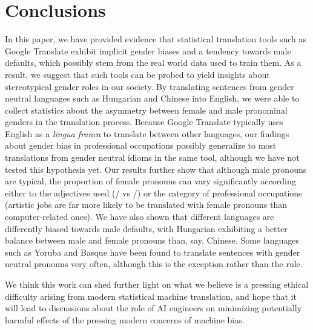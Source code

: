\documentclass[fleqn,10pt]{article}
\begin{document}
\section{Conclusions}
In this paper, we have provided evidence that statistical translation tools such as Google Translate exhibit implicit gender biases and a tendency towards male defaults, which possibly stem from the real world data used to train them. As a result, we suggest that such tools can be probed to yield insights about stereotypical gender roles in our society. By translating sentences from gender neutral languages such as Hungarian and Chinese into English, we were able to collect statistics about the asymmetry between female and male pronominal genders in the translation process. Because Google Translate typically uses English as a \emph{lingua franca}
 to translate between other languages, our findings about gender bias in professional occupations possibly generalize to most translations from gender neutral idioms in the same tool, although we have not tested this hypothesis yet. Our results further show that although male pronouns are typical, the proportion of female pronouns can vary significantly according either to the adjectives used (/ vs /) or the category of professional occupations (artistic jobs are far more likely to be translated with female pronouns than computer-related ones). We have also shown that different languages are differently biased towards male defaults, with Hungarian exhibiting a better balance between male and female pronouns than, say, Chinese. Some languages such as Yoruba and Basque have been found to translate sentences with gender neutral pronouns very often, although this is the exception rather than the rule.

We think this work can shed further light on what we believe is a pressing ethical difficulty arising from modern statistical machine translation, and hope that it will lead to discussions about the role of AI engineers on minimizing potentially harmful effects of the pressing modern concerns of machine bias.


\end{document}
